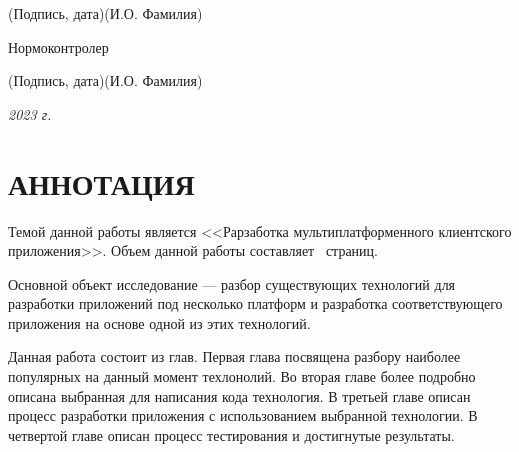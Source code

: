 \documentclass[14pt, russian]{scrartcl}
\begin{document}
\begin{titlepage}
\vspace{-2ex}
\noindent\hspace{13.5ex}\normalsize\hspace{170pt}\hspace{2ex}\scriptsize{(Подпись, дата)}\normalsize\hspace{30pt}\hspace{6ex}\scriptsize{(И.О. Фамилия)}\normalsize

\bigskip

\noindent Нормоконтролер \hfill \underline{\hspace{4cm}}\quad
\underline{\hspace{4cm}}

\vspace{-2ex}
\noindent\hspace{13.5ex}\normalsize\hspace{170pt}\hspace{2ex}\scriptsize{(Подпись, дата)}\normalsize\hspace{30pt}\hspace{6ex}\scriptsize{(И.О. Фамилия)}\normalsize
\vfill

 


\begin{center}
\textsl{2023 г.}
\end{center}
\end{titlepage}


\setlength{\tabcolsep}{3pt}
\newpage
\setcounter{page}{2}
\section*{АННОТАЦИЯ}

Темой данной работы является <<Рарзаботка мультиплатформенного клиентского приложения>>. Объем данной работы составляет~\pageref{TotPages} страниц.

Основной объект исследование --- разбор существующих технологий для разработки приложений под несколько платформ и разработка соответствующего приложения на основе одной из этих технологий.

Данная работа состоит из \totalsections{} глав. Первая глава посвящена разбору наиболее популярных на данный момент техлонолий. Во вторая главе более подробно описана выбранная для написания кода технология. В третьей главе описан процесс разработки приложения с использованием выбранной технологии. В четвертой главе описан процесс тестирования и достигнутые результаты.
\end{document}
